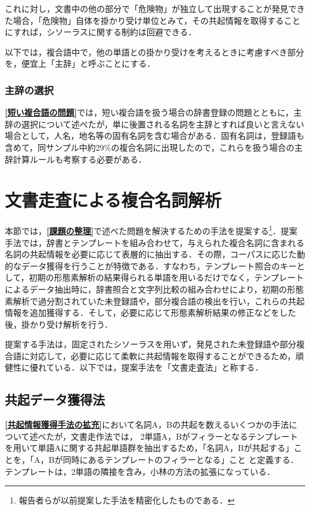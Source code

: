 これに対し，文書中の他の部分で「危険物」が独立して出現することが発見できた場合，「危険物」自体を掛かり受け単位とみて，その共起情報を取得することにすれば，シソーラスに関する制約は回避できる．

以下では，複合語中で，他の単語との掛かり受けを考えるときに考慮すべき部分を，便宜上「主辞」と呼ぶことにする．
\subsubsection{主辞の選択}\label{主辞の選択}
{\bf \ref{短い複合語の問題}}では，短い複合語を扱う場合の辞書登録の問題とともに，主辞の選択について述べたが，単に後置される名詞を主辞とすれば良いと言えない場合として，人名，地名等の固有名詞を含む場合がある．固有名詞は，登録語も含めて，同サンプル中約29\%の複合名詞に出現したので，これらを扱う場合の主辞計算ルールも考察する必要がある．

\section{文書走査による複合名詞解析}\label{文書走査による複合名詞解析}
本節では，{\bf \ref{課題の整理}}で述べた問題を解決するための手法を提案する\footnote{報告者らが以前提案した手法\cite{Hisamitsu1996}を精密化したものである．}．提案手法では，辞書とテンプレートを組み合わせて，与えられた複合名詞に含まれる名詞の共起情報を必要に応じて表層的に抽出する．その際，コーパスに応じた動的なデータ獲得を行うことが特徴である．すなわち，テンプレート照合のキーとして，初期の形態素解析の結果得られる単語を用いるだけでなく，テンプレートによるデータ抽出時に，辞書照合と文字列比較の組み合わせにより，初期の形態素解析で過分割されていた未登録語や，部分複合語の検出を行い，これらの共起情報を追加獲得する．そして，必要に応じて形態素解析結果の修正などをした後，掛かり受け解析を行う．

提案する手法は，固定されたシソーラスを用いず，発見された未登録語や部分複合語に対応して，必要に応じて柔軟に共起情報を取得することができるため，頑健性に優れている．以下では，提案手法を「文書走査法」と称する．

\subsection{共起データ獲得法}\label{共起データ獲得法}
{\bf \ref{共起情報獲得手法の拡充}}において名詞A，Bの共起を数えるいくつかの手法について述べたが，文書走作法では，\break
2単語A，Bがフィラーとなるテンプレートを用いて単語Aに関する共起単語群を抽出するため，「名詞A，Bが共起する」ことを，「A，Bが同時にあるテンプレートのフィラーとなる」こと\break
と定義する．テンプレートは，2単語の隣接を含み，小林の方法の拡張になっている．

